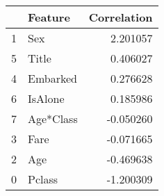\begin{tabular}{llr}
\toprule
{} &    Feature &  Correlation \\
\midrule
1 &        Sex &     2.201057 \\
5 &      Title &     0.406027 \\
4 &   Embarked &     0.276628 \\
6 &    IsAlone &     0.185986 \\
7 &  Age*Class &    -0.050260 \\
3 &       Fare &    -0.071665 \\
2 &        Age &    -0.469638 \\
0 &     Pclass &    -1.200309 \\
\bottomrule
\end{tabular}

